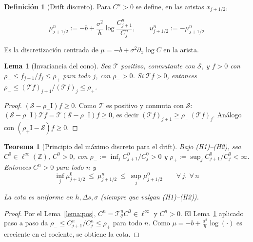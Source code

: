 \documentclass[11pt,letterpaper]{article}
\theoremstyle{plain}
\newtheorem{teorema}[theorem]{Teorema}
\newtheorem{lema}[theorem]{Lema}
\theoremstyle{definition}
\newtheorem{definicion}[theorem]{Definición}
\theoremstyle{remark}
\numberwithin{equation}{section}
\newcommand{\Z}{\mathbb{Z}}
\newcommand{\Sh}{\mathcal{S}}
\newcommand{\Id}{\mathrm{I}}
\newcommand{\Top}{\mathcal{T}}
\begin{document}
	\begin{definicion}[Drift discreto]
		Para \(C^n>0\) se define, en las aristas \(x_{j+1/2}\),
		
		\begin{equation}\label{eq:driftdisc}
			\mu^n_{j+1/2}:=-b+\frac{\sigma^2}{h}\log\frac{C^n_{j+1}}{C^n_j},\qquad u^n_{j+1/2}:=-\mu^n_{j+1/2}
		\end{equation}
		
		Es la discretización centrada de \(\mu=-b+\sigma^2\partial_x\log C\) en la arista.
	\end{definicion}
	
	\begin{lema}[Invariancia del cono]\label{lema:cono}
		Sea \(\Top\) positivo, conmutante con \(\Sh\), y \(f>0\) con \(\rho_-\le f_{j+1}/f_j\le\rho_+\) para todo \(j\), con \(\rho_->0\). Si \(\Top f>0\), entonces \(\rho_-\le(\Top f)_{j+1}/(\Top f)_j\le\rho_+\).
	\end{lema}
	
	\begin{proof}
		\((\Sh-\rho_-\Id)f\ge0\). Como \(\Top\) es positivo y conmuta con \(\Sh\): \((\Sh-\rho_-\Id)\Top f=\Top(\Sh-\rho_-\Id)f\ge0\), es decir \((\Top f)_{j+1}\ge\rho_-\,(\Top f)_j\). Análogo con \((\rho_+\Id-\Sh)f\ge0\).
	\end{proof}
	
	\begin{teorema}[Principio del máximo discreto para el drift]\label{teo:max}
		Bajo (H1)--(H2), sea \(C^0\in\ell^\infty(\Z)\), \(C^0>0\), con \(\rho_-:=\inf_jC^0_{j+1}/C^0_j>0\) y \(\rho_+:=\sup_jC^0_{j+1}/C^0_j<\infty\). Entonces \(C^n>0\) para todo \(n\) y
		\begin{equation}
			\inf_j\mu^0_{j+1/2}\ \le\ \mu^n_{j+1/2}\ \le\ \sup_j\mu^0_{j+1/2}\qquad\forall\,j,\ \forall\,n
		\end{equation}
		
		La cota es uniforme en \(h,\Delta s,\sigma\) (siempre que valgan (H1)--(H2)).
	\end{teorema}
	
	\begin{proof}
		Por el Lema~\ref{lema:pos}, \(C^n=\Top_\theta^nC^0\in\ell^\infty\) y \(C^n>0\). El Lema~\ref{lema:cono} aplicado paso a paso da \(\rho_-\le C^n_{j+1}/C^n_j\le\rho_+\) para todo \(n\). Como \(\mu=-b+\frac{\sigma^2}{h}\log(\cdot)\) es creciente en el cociente, se obtiene la cota.
		
	\end{proof}
	
\end{document}
